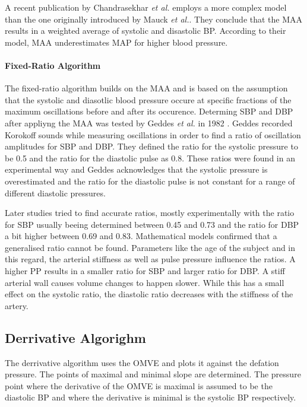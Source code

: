 A recent publication by Chandrasekhar \textit{et al.} \cite{Chandrasekhar2019} employs a more complex model than the one originally introduced by Mauck \textit{et al.}\cite{Mauck1980}. They conclude that the MAA results in a weighted average of systolic and disastolic BP. According to their model, MAA underestimates MAP for higher blood pressure. 

\paragraph{Fixed-Ratio Algorithm} The fixed-ratio algorithm builds on the MAA and is based on the assumption that the systolic and diasotlic blood pressure occure at specific fractions of the maximum oscillations before and after its occurence. Determing SBP and DBP after appliyng the MAA was tested by Geddes \textit{et al.} in 1982 \cite{Geddes1982}. Geddes recorded Korokoff sounds while measuring oscillations in order to find a ratio of oscillation amplitudes for SBP and DBP. They defined the ratio for the systolic pressure to be 0.5 and the ratio for the diastolic pulse as 0.8. These ratios were found in an experimental way and Geddes acknowledges that the systolic pressure is overestimated and the ratio for the diastolic pulse is not constant for a range of different diastolic pressures.

Later studies tried to find accurate ratios, mostly experimentally with the ratio for SBP usually beeing determined between 0.45 and 0.73 and the ratio for DBP a bit higher between 0.69 and 0.83.\cite{Drzewiecki1994,Forouzanfar2015} Mathematical models confirmed that a generalised ratio cannot be found. Parameters like the age of the subject and in this regard, the arterial stiffness as well as pulse pressure influence the ratios. \cite{Ursino1996} A higher PP results in a smaller ratio for SBP and larger ratio for DBP. A stiff arterial wall causes volume changes to happen slower. While this has a small effect on the systolic ratio, the diastolic ratio decreases with the stiffness of the artery.\cite{Babbs2012}



\subsection{Derrivative Algorighm}
The derrivative algorithm uses the OMVE and plots it against the defation pressure. The points of maximal and minimal slope are determined. The pressure point where the derivative of the OMVE is maximal is assumed to be the diastolic BP and where the derivative is minimal is the systolic BP respectively. \cite{Jazbinsek2010,Forouzanfar2015} 

